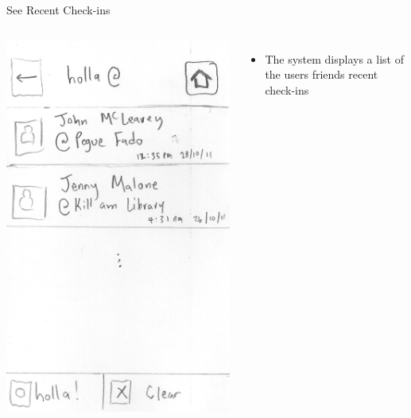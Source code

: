 \documentclass{beamer}
\begin{document}
\begin{frame}{See Recent Check-ins}
    \begin{columns}[c]
        \center\includegraphics[height=0.75 \textheight]{hand-drawn/hollar.png}
        \begin{itemize}
            \item The system displays a list of the users friends recent check-ins
        \end{itemize}
    \end{columns}
\end{frame}
\end{document}
